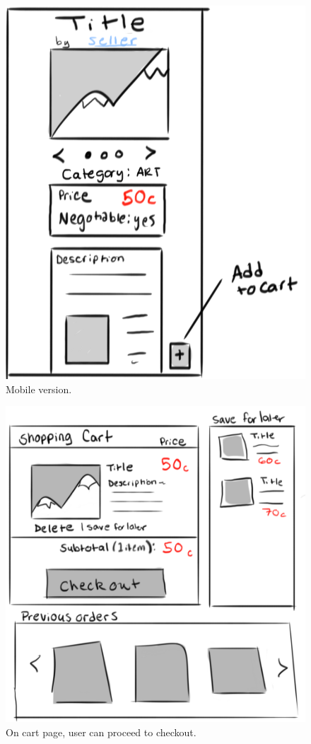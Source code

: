 \documentclass[]{article}
\begin{document}
\begin{enumerate}
		\begin{figure}
		  \includegraphics[width=\linewidth]{./pictures/product_mobile.png}
		  \caption{Mobile version.}
		  \label{fig:mobile8}
		\end{figure}
		
		\begin{figure}
		  \includegraphics[width=\linewidth]{./pictures/shopping_cart.png}
		  \caption{On cart page, user can proceed to checkout.}
		  \label{fig:buyer4}
		\end{figure}
		

\end{enumerate}
\end{document}
